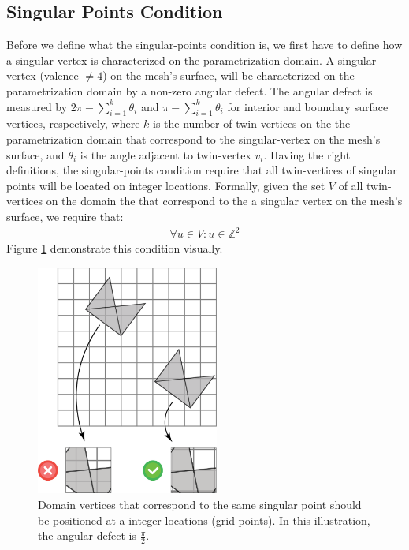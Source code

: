 \subsection{Singular Points Condition}
\label{label:singular_points_cond}
Before we define what the singular-points condition is, we first have to define how a singular vertex is characterized on the parametrization domain. A singular-vertex (valence $\neq 4$) on the mesh's surface, will be characterized on the parametrization domain by a non-zero angular defect. The angular defect is measured by $2\pi - \sum_{i=1}^k \theta_i$ and $\pi - \sum_{i=1}^k \theta_i$ for interior and boundary surface vertices, respectively, where $k$ is the number of twin-vertices on the the parametrization domain that correspond to the singular-vertex on the mesh's surface, and $\theta_i$ is the angle adjacent to twin-vertex $v_i$.
Having the right definitions, the singular-points condition require that all twin-vertices of singular points will be located on integer locations. Formally, given the set $V$ of all twin-vertices on the domain the that correspond to the a singular vertex on the mesh's surface, we require that:
\begin{equation}\label{eq:singular_points_cond}
\begin{split}
\forall u \in V: u \in \mathbb{Z}^2
\end{split}
\end{equation}
Figure \ref{fig:singular_points_req} demonstrate this condition visually.
\begin{figure}[ht]
\centering
\includegraphics[width=6cm]{figures/singular_points/singularity.png}
\caption[The Singular Points Requirement]{Domain vertices that correspond to the same singular point should be positioned at a integer locations (grid points). In this illustration, the angular defect is $\frac{\pi}{2}$.}
\label{fig:singular_points_req}
\end{figure}
